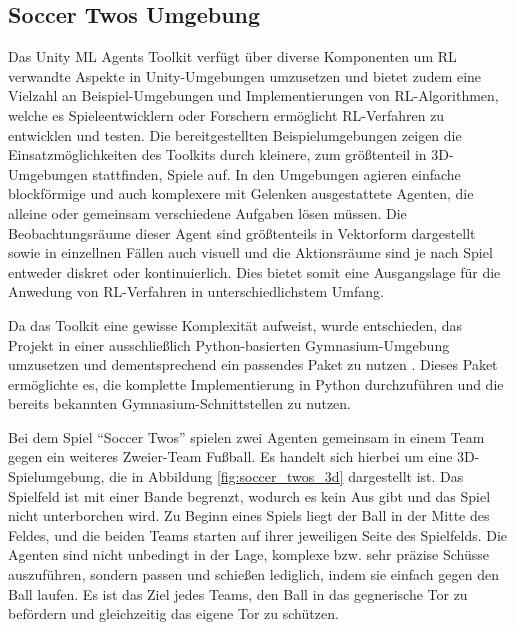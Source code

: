\documentclass[twocolumn]{webofc}
\begin{document}
\subsection{Soccer Twos Umgebung}

Das Unity \ac{ML} Agents Toolkit verfügt über diverse Komponenten um \ac{RL} verwandte Aspekte in Unity-Umgebungen umzusetzen und bietet zudem eine Vielzahl an Beispiel-Umgebungen und Implementierungen von \ac{RL}-Algorithmen, welche es Spieleentwicklern oder Forschern ermöglicht \ac{RL}-Verfahren zu entwicklen und testen. 
Die bereitgestellten Beispielumgebungen zeigen die Einsatzmöglichkeiten des Toolkits durch kleinere, zum größtenteil in 3D-Umgebungen stattfinden, Spiele auf. In den Umgebungen agieren einfache blockförmige und auch komplexere mit Gelenken ausgestattete Agenten, die alleine oder gemeinsam verschiedene Aufgaben lösen müssen. Die Beobachtungsräume dieser Agent sind größtenteils in Vektorform dargestellt sowie in einzellnen Fällen auch visuell und die Aktionsräume sind je nach Spiel entweder diskret oder kontinuierlich. Dies bietet somit eine Ausgangslage für die Anwedung von \ac{RL}-Verfahren in unterschiedlichstem Umfang.

Da das Toolkit eine gewisse Komplexität aufweist, wurde entschieden, das Projekt in einer ausschließlich Python-basierten Gymnasium-Umgebung umzusetzen und dementsprechend ein passendes Paket zu nutzen \cite{soccertwos}. Dieses Paket ermöglichte es, die komplette Implementierung in Python durchzuführen und die bereits bekannten Gymnasium-Schnittstellen zu nutzen.

Bei dem Spiel \enquote{Soccer Twos} spielen zwei Agenten gemeinsam in einem Team gegen ein weiteres Zweier-Team Fußball. Es handelt sich hierbei um eine 3D-Spielumgebung, die in Abbildung \ref{fig:soccer_twos_3d} dargestellt ist. Das Spielfeld ist mit einer Bande begrenzt, wodurch es kein Aus gibt und das Spiel nicht unterborchen wird. Zu Beginn eines Spiels liegt der Ball in der Mitte des Feldes, und die beiden Teams starten auf ihrer jeweiligen Seite des Spielfelds. Die Agenten sind nicht unbedingt in der Lage, komplexe bzw. sehr präzise Schüsse auszuführen, sondern passen und schießen lediglich, indem sie einfach gegen den Ball laufen. Es ist das Ziel jedes Teams, den Ball in das gegnerische Tor zu befördern und gleichzeitig das eigene Tor zu schützen.

\end{document}
